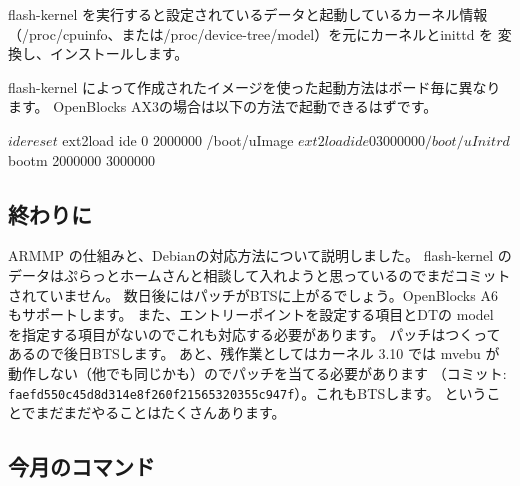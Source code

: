 \documentclass[mingoth,a4paper]{jsarticle}
\begin{document}
flash-kernel を実行すると設定されているデータと起動しているカーネル情報
（/proc/cpuinfo、または/proc/device-tree/model）を元にカーネルとinittd を
変換し、インストールします。

flash-kernel によって作成されたイメージを使った起動方法はボード毎に異なります。
OpenBlocks AX3の場合は以下の方法で起動できるはずです。

\begin{commandline}
$ ide reset
$ ext2load ide 0 2000000 /boot/uImage
$ ext2load ide 0 3000000 /boot/uInitrd
$ bootm 2000000 3000000
\end{commandline}


\subsection{終わりに}

ARMMP の仕組みと、Debianの対応方法について説明しました。
flash-kernel のデータはぷらっとホームさんと相談して入れようと思っているのでまだコミットされていません。
数日後にはパッチがBTSに上がるでしょう。OpenBlocks A6 もサポートします。
また、エントリーポイントを設定する項目とDTの model を指定する項目がないのでこれも対応する必要があります。
パッチはつくってあるので後日BTSします。
あと、残作業としてはカーネル 3.10 では mvebu が動作しない（他でも同じかも）のでパッチを当てる必要があります
（コミット: \texttt{faefd550c45d8d314e8f260f21565320355c947f}）。これもBTSします。
ということでまだまだやることはたくさんあります。


\subsection{今月のコマンド}
\end{document}
